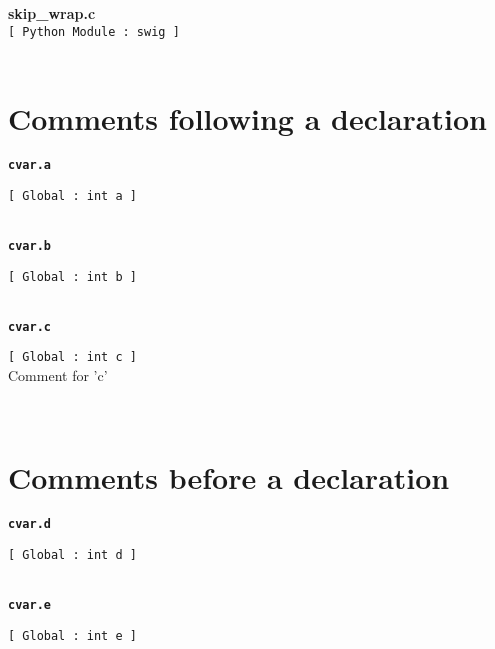 \setlength{\parindent}{0.0in}
\setlength{\textwidth}{6.5in}
\setlength{\oddsidemargin}{0.0in}
\pagestyle{headings}

{\Large \bf  skip\_wrap.c }\\
{\tt [ Python Module : swig ]  }\\
\\\section{Comments following a declaration}{\tt \bf cvar.a }
\\
\makebox[0.5in]{}\begin{minipage}[t]{6in}
{\tt [ Global : int  a ]  }\\

\end{minipage}\\

{\tt \bf cvar.b }
\\
\makebox[0.5in]{}\begin{minipage}[t]{6in}
{\tt [ Global : int  b ]  }\\

\end{minipage}\\

{\tt \bf cvar.c }
\\
\makebox[0.5in]{}\begin{minipage}[t]{6in}
{\tt [ Global : int  c ]  }\\
   Comment for 'c'   
\\

\end{minipage}\\

\section{Comments before a declaration}{\tt \bf cvar.d }
\\
\makebox[0.5in]{}\begin{minipage}[t]{6in}
{\tt [ Global : int  d ]  }\\

\end{minipage}\\

{\tt \bf cvar.e }
\\
\makebox[0.5in]{}\begin{minipage}[t]{6in}
{\tt [ Global : int  e ]  }\\

\end{minipage}\\

